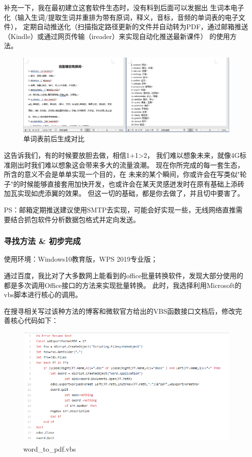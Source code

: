 \documentclass{article}
\begin{document}
        补充一下，我在最初建立这套软件生态时，没有料到后面可以发掘出
        生词本电子化（输入生词/提取生词并重排为带有原词，释义，音标，音频的单词表的电子文件），
        定期自动推送化（扫描指定路径更新的文件并自动转为PDF，通过邮箱推送（Kindle）或通过网页传输（ireader）来实现自动化推送最新课件）
        的使用方法。

        \begin{figure}[htbp]
        \centering
        \includegraphics[scale=0.32]{2.2-p1.png}
        \caption*{单词表前后生成对比}
        \end{figure}

        这告诉我们，有的时候要放胆去做，相信1+1>2，
        我们难以想象未来，就像4G标准刚出时我们难以想象这会带来多大的流量浪潮。
        现在你所完成的每一套生态，所含的意义不会是单单实现一个目的，在
        未来的某个瞬间，你或许会在写类似"轮子"的时候能够直接套用加快开发，也或许会在某天灵感迸发时在原有基础上添砖加瓦实现如虎添翼的效果。
        但这一切的基础，都是你去做了，并且切中要害了。

        PS：邮箱定期推送建议使用SMTP去实现，可能会好实现一些，无线网络直推需要结合抓包软件分析数据包格式并定向发送。

        \subsubsection{寻找方法 \& 初步完成}
        使用环境：Windows10教育版，WPS 2019专业版；

        通过百度，我比对了大多数网上能看到的office批量转换软件，发现大部分使用的都是多次调用Office接口的方法来实现批量转换。
        此时，我选择利用Microsoft的vbs脚本进行核心的调用。
        
        在搜寻相关写过该种方法的博客和微软官方给出的VBS函数接口文档后，修改完善核心代码如下：

        \begin{figure}[htbp]
        \centering
        \includegraphics[scale=0.38]{2.2-p2.png}
        \caption*{word\_to\_pdf.vbs}
        \end{figure}
\end{document}
